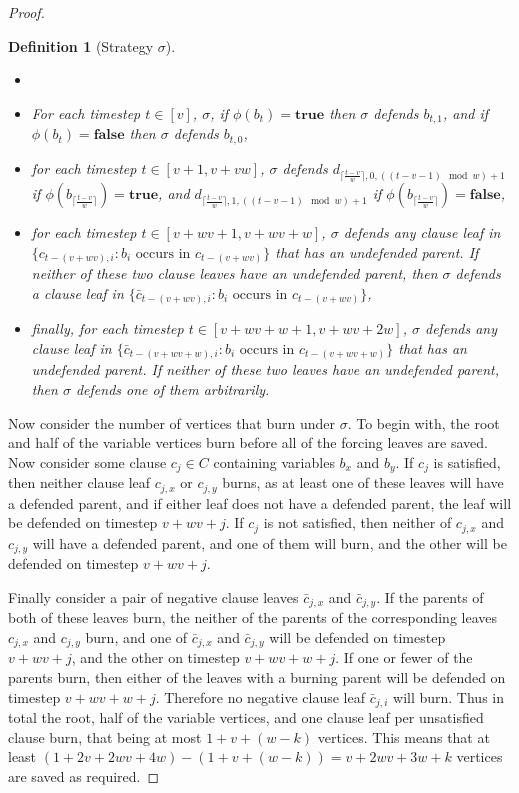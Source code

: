 \documentclass[a4paper,UKenglish,cleveref, autoref, thm-restate]{lipics-v2021} %
\newcounter{ctheorem}
\newtheorem{defn}[ctheorem]{Definition}
\begin{document}
\begin{toappendix}
\begin{proof}
\begin{defn}[Strategy $\sigma$]
\begin{itemize}
    \item[]
    \item For each timestep $t \in [v]$, $\sigma$, if $\phi(b_t) = \textbf{true}$ then $\sigma$ defends $b_{t,1}$, and if $\phi(b_t) = \textbf{false}$ then $\sigma$ defends $b_{t,0}$,
    \item for each timestep $t \in [v+1, v+vw]$, $\sigma$ defends $d_{\lceil\frac{t-v}{w}\rceil, 0, ((t-v-1) \mod w)+1}$ if $\phi(b_{\lceil\frac{t-v}{w}\rceil})=\textbf{true}$, and $d_{\lceil\frac{t-v}{w}\rceil, 1, ((t-v-1) \mod w)+1}$ if $\phi(b_{\lceil\frac{t-v}{w}\rceil})=\textbf{false}$,
    \item for each timestep $t \in [v+wv+1, v+wv+w]$, $\sigma$ defends any clause leaf in  $\{c_{t-(v+wv),i} : b_i \text{ occurs in }c_{t-(v+wv)}\}$ that has an undefended parent. If neither of these two clause leaves have an undefended parent, then $\sigma$ defends a clause leaf in $\{\bar{c}_{t-(v+wv),i} : b_i \text{ occurs in }c_{t-(v+wv)}\}$,
    \item finally, for each timestep $t \in [v+wv+w+1,v+wv+2w]$, $\sigma$ defends any clause leaf in $\{\bar{c}_{t-(v+wv+w),i} : b_i \text{ occurs in }c_{t-(v+wv+w)}\}$ that has an undefended parent. If neither of these two leaves have an undefended parent, then $\sigma$ defends one of them arbitrarily.
\end{itemize}
\end{defn}

Now consider the number of vertices that burn under $\sigma$. To begin with, the root and half of the variable vertices burn before all of the forcing leaves are saved. Now consider some clause $c_j \in C$ containing variables $b_x$ and $b_y$. If $c_j$ is satisfied, then neither clause leaf $c_{j,x}$ or $c_{j,y}$ burns, as at least one of these leaves will have a defended parent, and if either leaf does not have a defended parent, the leaf will be defended on timestep $v+wv+j$. If $c_j$ is not satisfied, then neither of $c_{j,x}$ and $c_{j,y}$ will have a defended parent, and one of them will burn, and the other will be defended on timestep $v+wv+j$.

Finally consider a pair of negative clause leaves $\bar{c}_{j,x}$ and $\bar{c}_{j,y}$. If the parents of both of these leaves burn, the neither of the parents of the corresponding leaves $c_{j,x}$ and $c_{j,y}$ burn, and one of $\bar{c}_{j,x}$ and $\bar{c}_{j,y}$ will be defended on timestep $v+wv+j$, and the other on timestep $v+wv+w+j$. If one or fewer of the parents burn, then either of the leaves with a burning parent will be defended on timestep $v+wv+w+j$. Therefore no negative clause leaf $\bar{c}_{j,i}$ will burn. Thus in total the root, half of the variable vertices, and one clause leaf per unsatisfied clause burn, that being at most $1+v+(w-k)$ vertices. This means that at least $(1+2v+2wv+4w)-(1+v+(w-k)) = v+2wv+3w+k$ vertices are saved as required.


\end{proof}
\end{toappendix}
\end{document}
